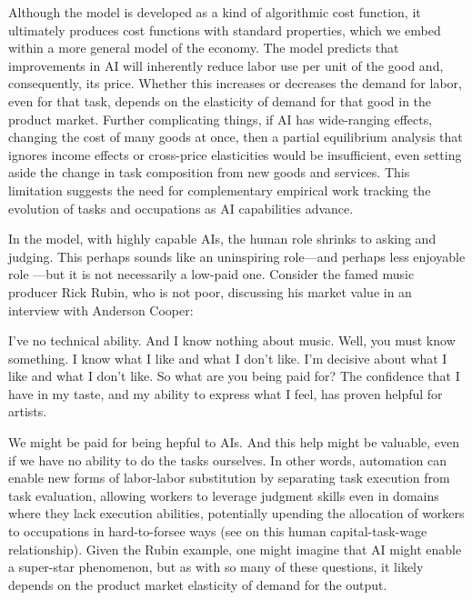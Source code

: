 \documentclass{article}
\theoremstyle{plain}
\theoremstyle{plain}
\begin{document}
Although the model is developed as a kind of algorithmic cost function, it ultimately produces cost functions with standard properties, which we embed within a more general model of the economy.  
The model predicts that improvements in AI will inherently reduce labor use per unit of the good and, consequently, its price.  
Whether this increases or decreases the demand for labor, even for that task, depends on the elasticity of demand for that good in the product market.  
Further complicating things, if AI has wide-ranging effects, changing the cost of many goods at once, then a partial equilibrium analysis that ignores income effects or cross-price elasticities would be insufficient, even setting aside the change in task composition from new goods and services.
This limitation suggests the need for complementary empirical work tracking the evolution of tasks and occupations as AI capabilities advance.

In the model, with highly capable AIs, the human role shrinks to asking and judging. 
This perhaps sounds like an uninspiring role---and perhaps less enjoyable role \citep{toner2024artificial}---but it is not necessarily a low-paid one. 
Consider the famed music producer Rick Rubin, who is not poor, discussing his market value in an interview with Anderson Cooper:
\begin{dialogue}
     I've no technical ability. And I know nothing about music.
     Well, you must know something.
     I know what I like and what I don't like. I'm decisive about what I like and what I don't like.
     So what are you being paid for?
     The confidence that I have in my taste, and my ability to express what I feel, has proven helpful for artists.
\end{dialogue}
We might be paid for being hepful to AIs.
And this help might be valuable, even if we have no ability to do the tasks ourselves.
In other words, automation can enable new forms of labor-labor substitution by separating task execution from task evaluation, allowing workers to leverage judgment skills even in domains where they lack execution abilities, potentially upending the allocation of workers to occupations in hard-to-forsee ways (see \cite{autor2013putting} on this human capital-task-wage relationship).
Given the Rubin example, one might imagine that AI might enable a super-star phenomenon, but as with so many of these questions, it likely depends on the product market elasticity of demand for the output.
\end{document}
